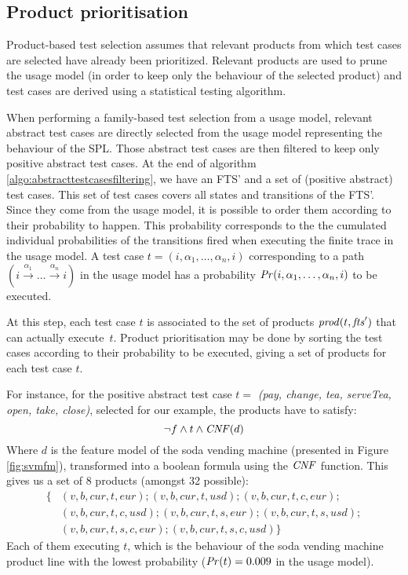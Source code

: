 \subsection{Product prioritisation}

\label{sec:coverage:usage:prioritisation}

Product-based test selection assumes that relevant products from which test cases are selected have already been prioritized. Relevant products are used to prune the usage model (in order to keep only the behaviour of the selected product) and test cases are derived using a statistical testing algorithm.

When performing a family-based test selection from a usage model, relevant abstract test cases are directly selected from the usage model representing the behaviour of the SPL. Those abstract test cases are then filtered to keep only positive abstract test cases. At the end of algorithm \ref{algo:abstracttestcasesfiltering}, we have an FTS' and a set of (positive abstract) test cases. This set of test cases covers all states and transitions of the FTS'. Since they come from the usage model, it is possible to order them according to their probability to happen. This probability corresponds to the the cumulated individual probabilities of the transitions fired when executing the finite trace in the usage model. 
A test case $t=(i, \alpha_1 , \ldots , \alpha_n, i)$ corresponding to a path $(i \overset{\alpha_1}{\longrightarrow} \ldots \overset{\alpha_n}{\longrightarrow} i)$ in the usage model has a probability $\mathit{Pr}(i, \alpha_1 , \ldots , \alpha_n, i)$ to be executed. 

At this step, each test case $t$ is associated to the set of products $\mathit{prod}(t,\mathit{fts}')$ that can actually execute~$t$. Product prioritisation may be done by sorting the test cases according to their probability to be executed, giving a set of products for each test case $t$.

For instance, for the positive abstract test case $t = $ \textit{(pay, change, tea, serve\-Tea, open, take, close)}, selected for our example, the products have to satisfy: $$\neg f \wedge t \wedge \mathit{CNF}(d)$$
Where $d$ is the feature model of the soda vending machine (presented in Figure \ref{fig:svmfm}), transformed into a boolean formula using the $\mathit{CNF}$ function.
This gives us a set of 8 products (amongst 32 possible):
\begin{align*}
\{&(v, b, cur, t, eur) ; (v, b, cur, t, usd) ; (v, b, cur, t, c, eur) ; \\
& (v, b, cur, t, c, usd) ; (v, b, cur, t, s, eur) ; (v, b, cur, t, s, usd) ;\\
&(v, b, cur, t, s, c, eur) ; (v, b, cur, t, s, c, usd) \}
\end{align*}
Each of them executing $t$, which is the behaviour of the soda vending machine product line with the lowest probability ($\mathit{Pr}(t) = 0.009$ in the usage model). 

